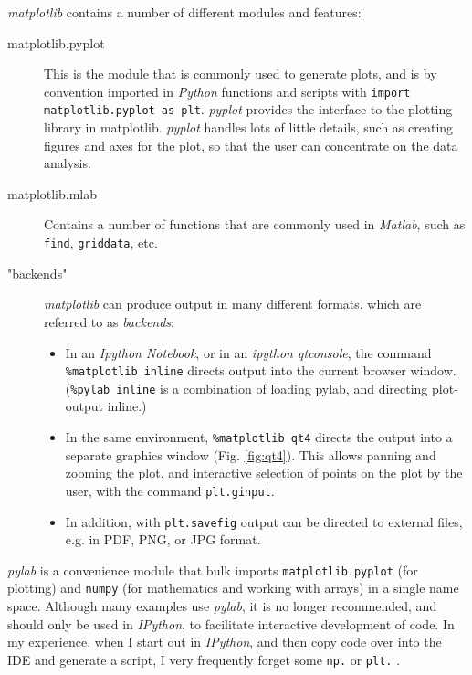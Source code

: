 \emph{matplotlib} contains a number of different modules and features:
\begin{description}
  \item[matplotlib.pyplot] This is the module that is commonly used to generate plots, and is by convention imported in \emph{Python} functions and scripts with \lstinline{import matplotlib.pyplot as plt}. \emph{pyplot}  provides the interface to the plotting library in matplotlib. \emph{pyplot} handles lots of little details, such as creating figures and axes for the plot, so that the user can concentrate on the data analysis.

    \item[matplotlib.mlab] Contains a number of functions that are commonly used in \emph{Matlab}, such as \lstinline{find}, \lstinline{griddata}, etc.

  \item["backends"] \emph{matplotlib} can produce output in many different formats, which are referred to as \emph{backends}:
    \begin{itemize}
      \item In an \emph{Ipython Notebook}, or in an \emph{ipython qtconsole}, the command \lstinline{%matplotlib inline} directs output into the current browser window. (\lstinline{%pylab inline} is a combination of loading pylab, and directing plot-output inline.)
      \item In the same environment, \lstinline{%matplotlib qt4} directs the output into a separate graphics window (Fig. \ref{fig:qt4}). This allows panning and zooming the plot, and interactive selection of points on the plot by the user, with the command \lstinline{plt.ginput}.

      \item In addition, with \lstinline{plt.savefig} output can be directed to external files, e.g. in PDF, PNG, or JPG format.
    \end{itemize}
\end{description}

\emph{pylab} is a convenience module that bulk imports \lstinline{matplotlib.pyplot} (for plotting) and \lstinline{numpy} (for mathematics and working with arrays) in a single name space. Although many examples use \emph{pylab}, it is no longer recommended, and should only be used in \emph{IPython}, to facilitate interactive development of code. In my experience, when I start out in \emph{IPython}, and then copy code over into the IDE and generate a script, I very frequently forget some \lstinline{np.} or \lstinline{plt.} .

